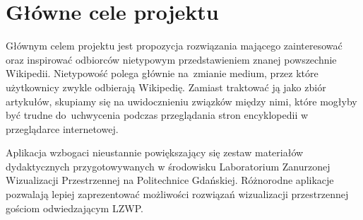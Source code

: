 \section{Główne cele projektu}
Głównym celem projektu jest propozycja rozwiązania mającego zainteresować oraz inspirować odbiorców nietypowym przedstawieniem znanej powszechnie Wikipedii. Nietypowość polega głównie na~zmianie medium, przez które użytkownicy zwykle odbierają Wikipedię. Zamiast traktować ją jako zbiór artykułów, skupiamy się na uwidocznieniu związków między nimi, które mogłyby być trudne do~uchwycenia podczas przeglądania stron encyklopedii w przeglądarce internetowej.

Aplikacja wzbogaci nieustannie powiększający się zestaw materiałów dydaktycznych przygotowywanych w środowisku Laboratorium Zanurzonej Wizualizacji Przestrzennej na Politechnice Gdańskiej. Różnorodne aplikacje pozwalają lepiej zaprezentować możliwości rozwiązań wizualizacji przestrzennej gościom odwiedzającym LZWP.